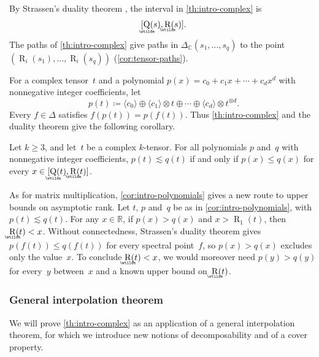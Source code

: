 \documentclass[11pt,letterpaper]{article}
\DeclareMathOperator{\asympsubrank}{\underaccent{\wtilde}{Q}}
\DeclareMathOperator{\asymprank}{\underaccent{\wtilde}{R}}
\DeclareMathOperator{\tensorrank}{R}
\newcommand{\RR}{\mathbb{R}}
\newcommand{\CC}{\mathbb{C}}
\newcommand{\asympleq}{\lesssim}
\begin{document}
By Strassen's duality theorem \cite[Theorem~3.8]{strassen1988asymptotic}, the interval in \cref{th:intro-complex} is
\[
[\asympsubrank(s),\asymprank(s)].
\]
The paths of \cref{th:intro-complex} give paths in \(\Delta_\CC(s_1,\ldots,s_q)\) to the point \((\tensorrank_i(s_1),\ldots,\tensorrank_i(s_q))\) (\cref{cor:tensor-paths}).

For a complex tensor~\(t\) and a polynomial \(p(x)=c_0+c_1x+\cdots+c_dx^d\) with nonnegative integer coefficients, let
\[
p(t)\coloneqq\langle c_0\rangle\oplus\langle c_1\rangle\otimes t\oplus\cdots\oplus\langle c_d\rangle\otimes t^{\otimes d}.
\]
Every \(f\in\Delta\) satisfies \(f(p(t))=p(f(t))\). Thus \cref{th:intro-complex} and the duality theorem give the following corollary.

\begin{corollary}\label{cor:intro-polynomials}
Let \(k\geq3\), and let~\(t\) be a complex \(k\)-tensor. For all polynomials \(p\) and~\(q\) with nonnegative integer coefficients, \(p(t)\asympleq q(t)\) if and only if \(p(x)\leq q(x)\) for every \(x\in[\asympsubrank(t),\asymprank(t)]\).
\end{corollary}

As for matrix multiplication, \cref{cor:intro-polynomials} gives a new route to upper bounds on asymptotic rank. Let \(t\), \(p\) and~\(q\) be as in \cref{cor:intro-polynomials}, with \(p(t)\asympleq q(t)\). For any $x\in \RR$, if \(p(x)>q(x)\) and \(x>\tensorrank_1(t)\), then \(\asymprank(t)<x\). Without connectedness, Strassen's duality theorem gives \(p(f(t))\leq q(f(t))\) for every spectral point~\(f\), so \(p(x)>q(x)\) excludes only the value~\(x\). To conclude \(\asymprank(t)<x\), we would moreover need \(p(y)>q(y)\) for every~\(y\) between~\(x\) and a known upper bound on~\(\asymprank(t)\).

\subsubsection{General interpolation theorem}

We will prove \cref{th:intro-complex} as an application of a general interpolation theorem, for which we introduce new notions of decomposability and of a cover property. 
\end{document}
